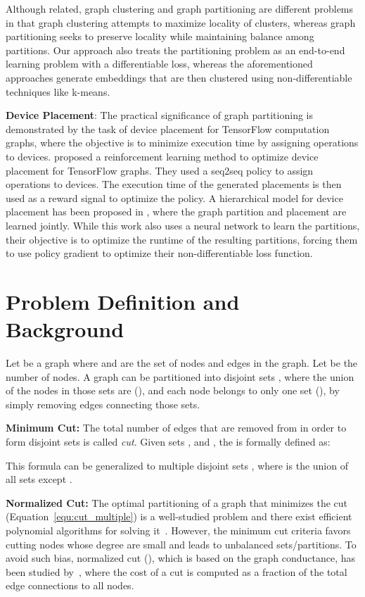 \documentclass[10pt,twocolumn]{article}
\begin{document}
Although related, graph clustering and graph partitioning are different problems in that graph clustering attempts to maximize locality of clusters, whereas graph partitioning seeks to preserve locality while maintaining balance among partitions. Our approach also treats the partitioning problem as an end-to-end learning problem with a differentiable loss, whereas the aforementioned approaches generate embeddings that are then clustered using non-differentiable techniques like k-means.

\noindent\textbf{Device Placement}:
The practical significance of graph partitioning is demonstrated by the task of device placement for TensorFlow computation graphs, where the objective is to minimize execution time by assigning operations to devices. 
\cite{azalia_2017} proposed a reinforcement learning method to optimize device placement for TensorFlow graphs. They used a seq2seq policy to assign operations to devices.
The execution time of the generated placements is then used as a reward signal to optimize the policy. A hierarchical model for device placement has been proposed in \cite{azalia_2018}, where the graph partition and placement are learned jointly. While this work also uses a neural network to learn the partitions, their objective is to optimize the runtime of the resulting partitions, forcing them to use policy gradient to optimize their non-differentiable loss function. \section{Problem Definition and Background}
\label{sec:probDef}
Let  be a graph where  and  are the set of nodes and edges in the graph. Let  be the number of nodes. A graph  can be partitioned into  disjoint sets , where the union of the nodes in those sets are  (), and each node belongs to only one set (), by simply removing edges connecting those sets. 

\noindent\textbf{Minimum Cut:}
The total number of edges that are removed from  in order to form disjoint sets is called \emph{cut}. Given sets , and , the  is formally defined as:


This formula can be generalized to multiple disjoint sets , where  is the union of all sets except .



\noindent\textbf{Normalized Cut:}
The optimal partitioning of a graph that minimizes the cut (Equation~\ref{equ:cut_multiple}) is a well-studied problem and there exist efficient polynomial algorithms for solving it~\cite{Papadimitriou_1982}. However, the minimum cut criteria favors cutting nodes whose degree are small and leads to unbalanced sets/partitions.
To avoid such bias, normalized cut (), which is based on the graph conductance, has been studied by~\cite{Shi_2000, ZhangR18}, where the cost of a cut is computed as a fraction of the total edge connections to all nodes.
\end{document}
